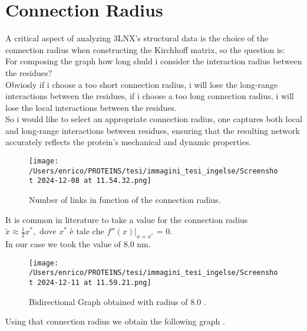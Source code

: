 \documentclass[English, Lau, oneside]{sapthesis}
\begin{document}
\newpage
\section{Connection Radius}\label{connection_radius}
\noindent A critical aspect of analyzing 3LNX’s structural data is the choice of the connection radius when constructing the Kirchhoff matrix, so the question is:\\
For composing the graph how long shuld i consider the interaction radius between the residues?\\
Obviosly if i choose a too short connection radius, i will lose the long-range interactions between the residues, if i choose a too long connection radius, i will lose the local interactions between the residues.\\
So i would like to select an appropriate connection radius, one captures both local and long-range interactions between residues, ensuring that the resulting network accurately reflects the protein’s mechanical and dynamic properties.
\begin{figure}[h!]
    \centering
    \texttt{[image: /Users/enrico/PROTEINS/tesi/immagini\_tesi\_ingelse/Screenshot 2024-12-08 at 11.54.32.png]}
    \caption{Number of links in function of the connection radius.}
\end{figure}

It is common in literature to take a value for the connection radius $\tilde{x} \approx \frac{1}{2} x^*, \text{ dove } x^* \text{ è tale che } f''(x) \big|_{x = x^*}$ = 0.\\
In our case we took the value of 8.0 nm.\\
\begin{figure}[h!]
    \centering
    \texttt{[image: /Users/enrico/PROTEINS/tesi/immagini\_tesi\_ingelse/Screenshot 2024-12-11 at 11.59.21.png]}
    \label{fig:grafo_connessione}
    \caption{Bidirectional Graph obtained with radius of 8.0 .}
\end{figure}
Using that connection radius we obtain the following graph .
\newpage
\end{document}
